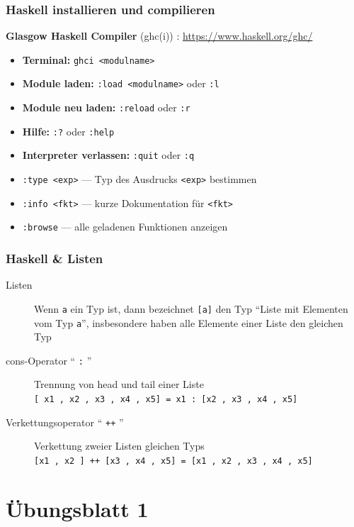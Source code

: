 \documentclass{beamer}
\begin{document}
\begin{frame}\frametitle{Haskell installieren und compilieren}
	\textbf{Glasgow Haskell Compiler} (ghc(i)) :  \url{https://www.haskell.org/ghc/}
	
	\begin{itemize}
		\item \textbf{Terminal:} \texttt{ghci <modulname>}
		\item \textbf{Module laden: } \texttt{:load <modulname>} oder \texttt{:l}
		\item \textbf{Module neu laden: } \texttt{:reload} oder \texttt{:r}
		\item \textbf{Hilfe: } \texttt{:?} oder \texttt{:help}
		\item \textbf{Interpreter verlassen: } \texttt{:quit} oder \texttt{:q}
		
		\bigskip
		
 		\item \texttt{:type <exp>} --- Typ des Ausdrucks \texttt{<exp>} bestimmen
		\item \texttt{:info <fkt>} --- kurze Dokumentation für \texttt{<fkt>}
		\item \texttt{:browse} --- alle geladenen Funktionen anzeigen
	\end{itemize}
\end{frame}
%
\begin{frame}[fragile] \frametitle{Haskell \& Listen}
	\begin{description}
		\item[Listen] Wenn \texttt{a} ein Typ ist, dann bezeichnet \texttt{[a]} den Typ ``Liste mit Elementen vom Typ \texttt{a}'', insbesondere
		haben alle Elemente einer Liste den gleichen Typ
		\pause
		\item[cons-Operator `` \texttt{:} '']  Trennung von head und tail einer Liste \\
		\lstinline{[ x1 , x2 , x3 , x4 , x5] = x1 : [x2 , x3 , x4 , x5]}
		\bigskip \pause
		\item[Verkettungsoperator `` \texttt{++} ''] Verkettung zweier Listen gleichen Typs \\
		\lstinline{[x1 , x2 ] ++ [x3 , x4 , x5] = [x1 , x2 , x3 , x4 , x5]}
	\end{description}
\end{frame}
%

\section{Übungsblatt 1}
\end{document}
